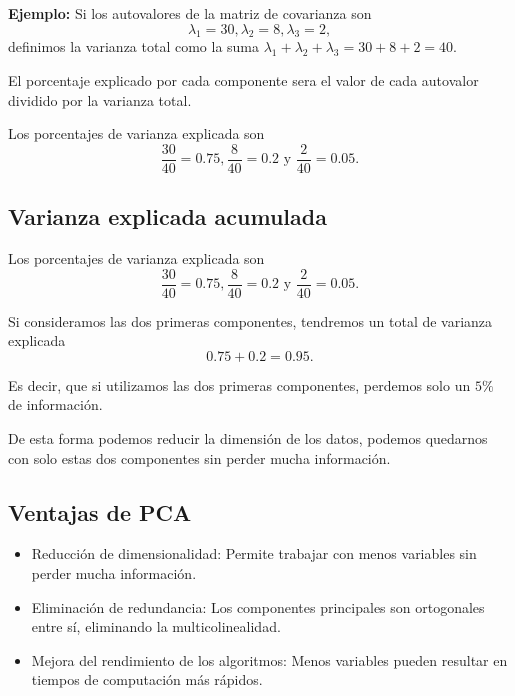 \documentclass[a4paper]{article}
\begin{document}
\textbf{Ejemplo:} Si los autovalores de la matriz de covarianza son
$$
\lambda_1 = 30, \lambda_2 = 8, \lambda_3 = 2,
$$
definimos la varianza total como la suma $\lambda_1 + \lambda_2 + \lambda_3 = 30 + 8 + 2 = 40$.

El porcentaje explicado por cada componente sera el valor de cada autovalor dividido por la varianza total.

Los porcentajes de varianza explicada son
$$\frac{30}{40} = 0.75, \frac{8}{40} = 0.2 \text{ y } \frac{2}{40} = 0.05.$$

\subsection{Varianza explicada acumulada}

Los porcentajes de varianza explicada son
$$\frac{30}{40} = 0.75, \frac{8}{40} = 0.2 \text{ y } \frac{2}{40} = 0.05.$$

Si consideramos las dos primeras componentes, tendremos un total de varianza explicada
$$0.75 + 0.2 = 0.95.$$

Es decir, que si utilizamos las dos primeras componentes, perdemos solo un $5\%$ de información.

De esta forma podemos reducir la dimensión de los datos, podemos quedarnos con solo estas dos componentes sin perder mucha información.

\subsection{Ventajas de PCA}
\begin{itemize}
    \item Reducción de dimensionalidad: Permite trabajar con menos variables sin perder mucha información.
    \item Eliminación de redundancia: Los componentes principales son ortogonales entre sí, eliminando la multicolinealidad.
    \item Mejora del rendimiento de los algoritmos: Menos variables pueden resultar en tiempos de computación más rápidos.
\end{itemize}
\end{document}
